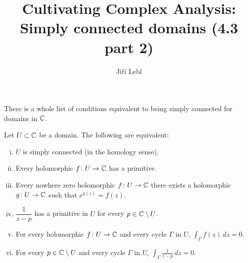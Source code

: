 \documentclass[10pt,aspectratio=169]{beamer}
\author{Ji\v{r}\'i Lebl}
\institute[OSU]{%
Departemento pri Matematiko de Oklahoma {\^S}tata Universitato}
\title{Cultivating Complex Analysis:\\%
Simply connected domains (4.3 part 2)}
\date{}
\begin{document}
\begin{frame}
\titlepage
\end{frame}

\begin{frame}

There is a whole list of conditions equivalent
to being simply connected for domains in ${\mathbb{C}}$.

\pause

\begin{proposition}
Let $U \subset {\mathbb{C}}$ be a domain.  The following are equivalent:
\begin{enumerate}[(i)]
\item \label{thm:simplyconnected:i}
$U$ is simply connected (in the homology sense).
\pause
\item \label{thm:simplyconnected:ii}
Every holomorphic $f \colon U \to {\mathbb{C}}$ has a primitive.
\pause
\item \label{thm:simplyconnected:iii}
Every nowhere zero holomorphic $f \colon U \to {\mathbb{C}}$ there exists
a holomorphic $g \colon U \to {\mathbb{C}}$ such that $e^{g(z)} = f(z)$.
\pause
\item \label{thm:simplyconnected:iv}
$\dfrac{1}{z-p}$ has a primitive in $U$ for every $p \in {\mathbb{C}} \setminus U$.
\pause
\item \label{thm:simplyconnected:v}
For every holomorphic $f \colon U \to {\mathbb{C}}$ and every
cycle $\Gamma$ in $U$, \quad
$\displaystyle
\int_\Gamma f(z) \, dz = 0$.
\pause
\item \label{thm:simplyconnected:vi}
For every $p \in {\mathbb{C}} \setminus U$ and every
cycle $\Gamma$ in $U$, \quad
$\displaystyle
\int_\Gamma \frac{1}{z-p} \, dz = 0$.
\end{enumerate}
\end{proposition}

\end{frame}
\end{document}
